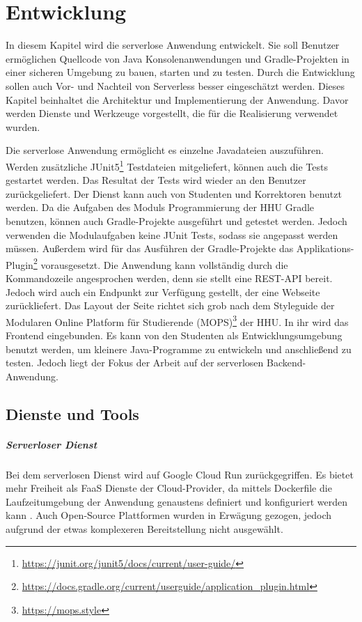 \chapter{Entwicklung}
In diesem Kapitel wird die serverlose Anwendung entwickelt.
Sie soll Benutzer ermöglichen Quellcode von Java Konsolenanwendungen und Gradle-Projekten
in einer sicheren Umgebung zu bauen, starten und zu testen. Durch die Entwicklung sollen auch Vor- und Nachteil
von Serverless besser eingeschätzt werden.
Dieses Kapitel beinhaltet die Architektur und Implementierung
der Anwendung. Davor werden Dienste und Werkzeuge vorgestellt,
die für die Realisierung verwendet wurden.

Die serverlose Anwendung ermöglicht es einzelne Javadateien auszuführen.
Werden zusätzliche JUnit5\footnote{\url{https://junit.org/junit5/docs/current/user-guide/}}
Testdateien mitgeliefert, können auch die Tests gestartet werden.
Das Resultat der Tests wird wieder an den Benutzer zurückgeliefert.
Der Dienst kann auch von Studenten und
Korrektoren benutzt werden. Da die Aufgaben des Moduls Programmierung der HHU Gradle benutzen,
können auch Gradle-Projekte ausgeführt und getestet werden.
Jedoch verwenden die Modulaufgaben keine JUnit Tests, sodass sie angepasst werden müssen.
Außerdem wird für das Ausführen der Gradle-Projekte
das Applikations-Plugin\footnote{\url{https://docs.gradle.org/current/userguide/application_plugin.html}}
vorausgesetzt. Die Anwendung kann vollständig durch die Kommandozeile angesprochen werden, denn
sie stellt eine REST-API bereit.
Jedoch wird auch ein Endpunkt zur Verfügung gestellt, der eine Webseite zurückliefert.
Das Layout der Seite richtet sich grob nach dem Styleguide der
Modularen Online Platform für Studierende (MOPS)\footnote{\url{https://mops.style}}
der HHU. In ihr wird das Frontend eingebunden.
Es kann von den Studenten als Entwicklungsumgebung benutzt werden, um
kleinere Java-Programme zu entwickeln und anschließend zu testen.
Jedoch liegt der Fokus der Arbeit auf der serverlosen Backend-Anwendung.


\section{Dienste und Tools}
\paragraph{Serverloser Dienst} Bei dem serverlosen Dienst wird auf Google Cloud Run zurückgegriffen.
Es bietet mehr Freiheit als FaaS Dienste der Cloud-Provider, da mittels Dockerfile die Laufzeitumgebung
der Anwendung genaustens definiert und konfiguriert werden kann \cite{CloudRun}. Auch Open-Source
Plattformen wurden in Erwägung gezogen, jedoch aufgrund der etwas komplexeren Bereitstellung nicht ausgewählt.

